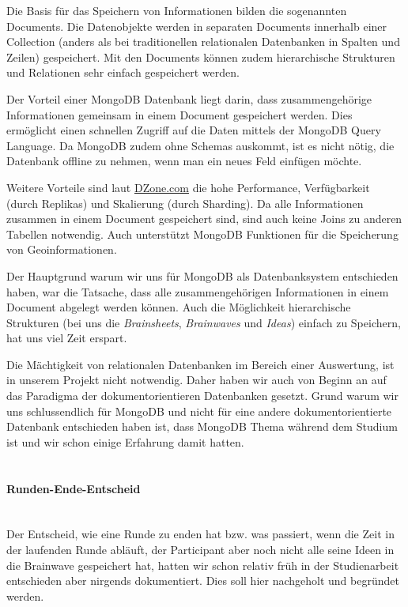Die Basis für das Speichern von Informationen bilden die sogenannten Documents. Die Datenobjekte werden in separaten Documents innerhalb einer Collection (anders als bei traditionellen relationalen Datenbanken in Spalten und Zeilen) gespeichert. Mit den Documents können zudem  hierarchische Strukturen und Relationen sehr einfach gespeichert werden.

Der Vorteil einer MongoDB Datenbank liegt darin, dass zusammengehörige Informationen gemeinsam in einem Document gespeichert werden. Dies ermöglicht einen schnellen Zugriff auf die Daten mittels der MongoDB Query Language. Da MongoDB zudem ohne Schemas auskommt, ist es nicht nötig, die Datenbank offline zu nehmen, wenn man ein neues Feld einfügen möchte.

Weitere Vorteile sind laut \href{DZone.com}{DZone.com} die hohe Performance, Verfügbarkeit (durch Replikas) und Skalierung (durch Sharding). Da alle Informationen zusammen in einem Document gespeichert sind, sind auch keine Joins zu anderen Tabellen notwendig. Auch unterstützt MongoDB Funktionen für die Speicherung von Geoinformationen.

Der Hauptgrund warum wir uns für MongoDB als Datenbanksystem entschieden haben, war die Tatsache, dass alle zusammengehörigen Informationen in einem Document abgelegt werden können. Auch die Möglichkeit hierarchische Strukturen (bei uns die \textit{Brainsheets}, \textit{Brainwaves} und \textit{Ideas}) einfach zu Speichern, hat uns viel Zeit erspart.

Die Mächtigkeit von relationalen Datenbanken im Bereich einer Auswertung, ist in unserem Projekt nicht notwendig. Daher haben wir auch von Beginn an auf das Paradigma der dokumentorientieren Datenbanken gesetzt. Grund warum wir uns schlussendlich für MongoDB und nicht für eine andere dokumentorientierte Datenbank entschieden haben ist, dass MongoDB Thema während dem Studium ist und wir schon einige Erfahrung damit hatten.
\\
\\

\paragraph*{Runden-Ende-Entscheid}~\\

Der Entscheid, wie eine Runde zu enden hat bzw. was passiert, wenn die Zeit in der laufenden Runde abläuft, der Participant aber noch nicht alle seine Ideen in die Brainwave gespeichert hat, hatten wir schon relativ früh in der Studienarbeit entschieden aber nirgends dokumentiert. Dies soll hier nachgeholt und begründet werden.

